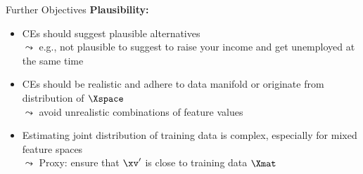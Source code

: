 \documentclass[11pt,compress,t,notes=noshow, aspectratio=169, xcolor=table, usenames,dvipsnames]{beamer}
\begin{document}
\begin{frame}{Further Objectives}
		\textbf{Plausibility:}
		\begin{itemize}
			\item<1-> CEs should suggest plausible alternatives\\
			$\leadsto$ e.g., not plausible to suggest to raise your income and get unemployed at the same time
			\item<2-> CEs should be realistic and adhere to data manifold or originate from distribution of $\Xspace$\\
			$\leadsto$ avoid unrealistic combinations of feature values
			\item<3-> Estimating joint distribution of training data is complex, especially for mixed feature spaces\\
			$\leadsto$ Proxy: ensure that $\xv'$ is close to training data $\Xmat$
		\end{itemize}	
\end{frame}
\end{document}
